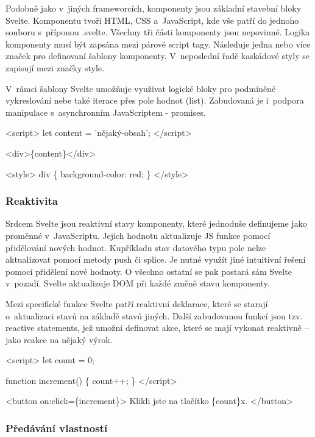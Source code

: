 Podobně jako v~jiných frameworcích, komponenty jsou základní stavební bloky Svelte. Komponentu tvoří HTML, CSS a~JavaScript, kde vše patří do jednoho souboru s~příponou .svelte. 
Všechny tři části komponenty jsou nepovinné. Logika komponenty musí být zapsána mezi párové script tagy. Následuje jedna nebo více značek pro definovaní šablony komponenty. 
V~neposlední řadě kaskádové styly se zapisují mezi značky style.

V~rámci šablony Svelte umožňuje využívat logické bloky pro podmíněné vykreslování nebe také iterace přes pole hodnot (list). 
Zabudovaná je i~podpora manipulace s~asynchronním JavaScriptem - promises.\cite{svelte}

\begin{prog}
<script>
  let content = 'nějaký-obsah';
</script>

<div>\{content\}</div>
  
<style>
  div \{
    background-color: red;
  \}
</style>
\end{prog}

\subsubsection{Reaktivita}

Srdcem Svelte jsou reaktivní stavy komponenty, které jednoduše definujeme jako proměnné v~JavaScriptu. Jejich hodnotu aktualizuje JS funkce pomocí přidělování nových hodnot. 
Kupříkladu stav datového typu pole nelze aktualizovat pomocí metody push či splice. Je nutné využít jiné intuitivní řešení pomocí přidělení nové hodnoty.
O všechno ostatní se pak postará sám Svelte v~pozadí. Svelte aktualizuje DOM při každé změně stavu komponenty. 

Mezi specifické funkce Svelte patří reaktivní deklarace, které se starají o~aktualizaci stavů na základě stavů jiných. 
Další zabudovanou funkcí jsou tzv. reactive statements, jež umožní definovat akce, které se mají vykonat reaktivně -- jako reakce na nějaký výrok.\cite{sveltehandbook,svelte}

\begin{prog}
<script>
  let count = 0;

  function increment() \{
    count++;
  \}
</script>

<button on:click=\{increment\}>
  Klikli jste na tlačítko \{count\}x.
</button>
\end{prog}

\subsubsection{Předávání vlastností}

